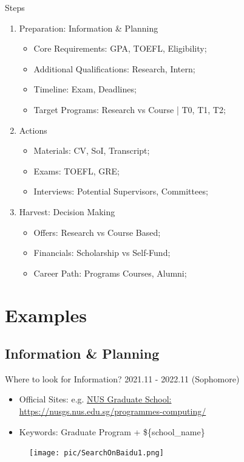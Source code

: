 \documentclass[UTF8]{beamer}
\begin{document}
\begin{frame}{\normalsize{Steps}}
  \begin{enumerate}

    \item Preparation: Information \& Planning

      \begin{itemize}
        \item Core Requirements: \hfill {\tiny GPA, TOEFL, Eligibility;}
        \item Additional Qualifications: \hfill {\tiny Research, Intern;}
        \item Timeline: \hfill {\tiny Exam, Deadlines;}
        \item Target Programs: \hfill {\tiny Research vs Course | T0, T1, T2;}
      \end{itemize}

    \item Actions
      \begin{itemize}
        \item Materials: \hfill {\tiny CV, SoI, Transcript;}
        \item Exams: \hfill {\tiny TOEFL, GRE;}
        \item Interviews: \hfill {\tiny Potential Supervisors, Committees;}
      \end{itemize}

    \item Harvest: Decision Making
      \begin{itemize}
        \item Offers: \hfill {\tiny Research vs Course Based;}
        \item Financials: \hfill {\tiny Scholarship vs Self-Fund;}
        \item Career Path: \hfill {\tiny Programs Courses, Alumni;}
      \end{itemize}
  \end{enumerate}
\end{frame}

\section{Examples}

\subsection{Information  \& Planning}
\begin{frame}{Where to look for Information? \hfill 2021.11 - 2022.11 \tiny{(Sophomore)}}
  \begin{itemize}
    \item Official Sites: e.g. \href{https://nusgs.nus.edu.sg/programmes-computing/}{\tiny{NUS Graduate School:} {\tiny https://nusgs.nus.edu.sg/programmes-computing/}}
    \item Keywords: Graduate Program + \$\{school\_name\}
  \end{itemize}
  \begin{figure}[h]
    \centering
    \texttt{[image: pic/SearchOnBaidu1.png]}
  \end{figure}
\end{frame}
\end{document}
